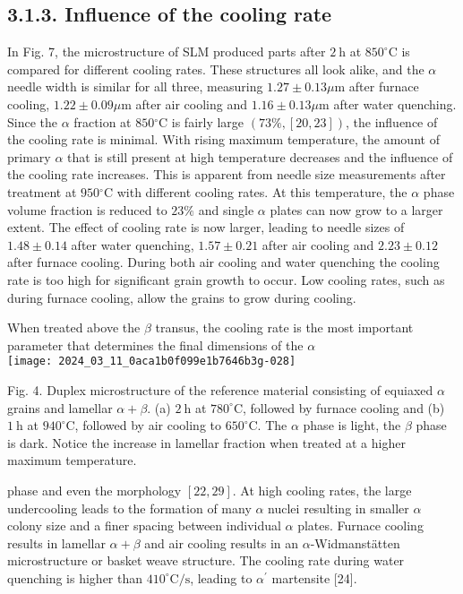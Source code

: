 \documentclass[10pt]{article}
\begin{document}
\subsection*{3.1.3. Influence of the cooling rate}
In Fig. 7, the microstructure of SLM produced parts after $2 \mathrm{~h}$ at $850^{\circ} \mathrm{C}$ is compared for different cooling rates. These structures all look alike, and the $\alpha$ needle width is similar for all three, measuring $1.27 \pm 0.13 \mu \mathrm{m}$ after furnace cooling, $1.22 \pm 0.09 \mu \mathrm{m}$ after air cooling and $1.16 \pm 0.13 \mu \mathrm{m}$ after water quenching. Since the $\alpha$ fraction at $850{ }^{\circ} \mathrm{C}$ is fairly large $(73 \%,[20,23])$, the influence of the cooling rate is minimal. With rising maximum temperature, the amount of primary $\alpha$ that is still present at high temperature decreases and the influence of the cooling rate increases. This is apparent from needle size measurements after treatment at $950{ }^{\circ} \mathrm{C}$ with different cooling rates. At this temperature, the $\alpha$ phase volume fraction is reduced to $23 \%$ and single $\alpha$ plates can now grow to a larger extent. The effect of cooling rate is now larger, leading to needle sizes of $1.48 \pm 0.14$ after water quenching, $1.57 \pm 0.21$ after air cooling and $2.23 \pm 0.12$ after furnace cooling. During both air cooling and water quenching the cooling rate is too high for significant grain growth to occur. Low cooling rates, such as during furnace cooling, allow the grains to grow during cooling.

When treated above the $\beta$ transus, the cooling rate is the most important parameter that determines the final dimensions of the $\alpha$\\
\texttt{[image: 2024\_03\_11\_0aca1b0f099e1b7646b3g-028]}

Fig. 4. Duplex microstructure of the reference material consisting of equiaxed $\alpha$ grains and lamellar $\alpha+\beta$. (a) $2 \mathrm{~h}$ at $780^{\circ} \mathrm{C}$, followed by furnace cooling and (b) $1 \mathrm{~h}$ at $940^{\circ} \mathrm{C}$, followed by air cooling to $650^{\circ} \mathrm{C}$. The $\alpha$ phase is light, the $\beta$ phase is dark. Notice the increase in lamellar fraction when treated at a higher maximum temperature.

phase and even the morphology $[22,29]$. At high cooling rates, the large undercooling leads to the formation of many $\alpha$ nuclei resulting in smaller $\alpha$ colony size and a finer spacing between individual $\alpha$ plates. Furnace cooling results in lamellar $\alpha+\beta$ and air cooling results in an $\alpha$-Widmanstätten microstructure or basket weave structure. The cooling rate during water quenching is higher than $410^{\circ} \mathrm{C} / \mathrm{s}$, leading to $\alpha^{\prime}$ martensite [24].
\end{document}
